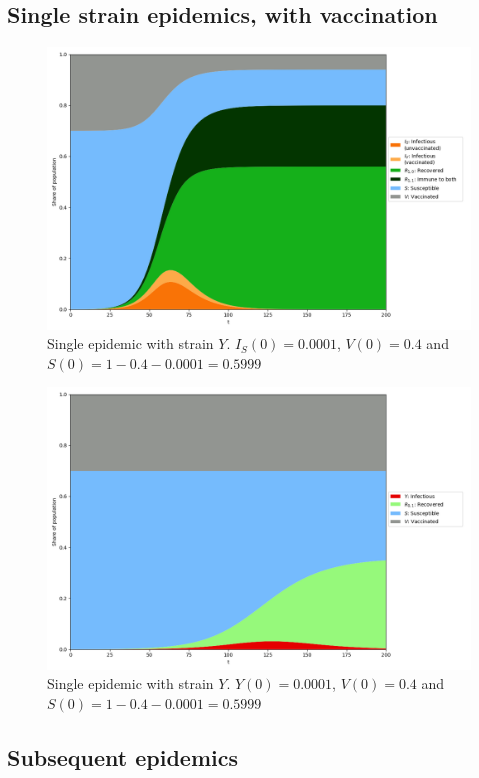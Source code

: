 \documentclass[10pt,a4paper]{article}
\begin{document}
\subsection{Single strain epidemics, with vaccination}
\begin{figure}[ht]\centering
    \includegraphics[width=0.9\linewidth]{../Figures/TwoStrainModel_OnlyI_Vacc.png}
    \caption{Single epidemic with strain $Y$. $I_S(0)=0.0001$, $V(0)=0.4$ and $S(0)=1-0.4-0.0001=0.5999$}
\end{figure}
\begin{figure}[ht]\centering
    \includegraphics[width=0.9\linewidth]{../Figures/TwoStrainModel_OnlyY_Vacc.png}
    \caption{Single epidemic with strain $Y$. $Y(0)=0.0001$, $V(0)=0.4$ and $S(0)=1-0.4-0.0001=0.5999$}
\end{figure}


\subsection{Subsequent epidemics}
\end{document}
